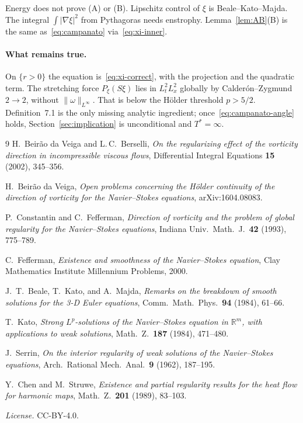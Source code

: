\documentclass[11pt,a4paper]{article}
\theoremstyle{definition}
\theoremstyle{remark}
\newcommand{\R}{\mathbb{R}}
\newcommand{\abs}[1]{\lvert#1\rvert}
\newcommand{\norm}[1]{\lVert#1\rVert}
\begin{document}
Energy does not prove (A) or (B). Lipschitz control of \(\xi\) is
Beale--Kato--Majda. The integral \(\int\abs{\nabla\xi}^2\) from
Pythagoras needs enstrophy. Lemma~\ref{lem:AB}(B) is the same as~\eqref{eq:campanato}
via~\eqref{eq:xi-inner}.

\paragraph{What remains true.}
On \(\{r>0\}\) the equation is~\eqref{eq:xi-correct}, with the projection
and the quadratic term. The stretching force \(P_\xi(S\xi)\) lies in
\(L^2_t L^2_x\) globally by Calder\'on--Zygmund \(2\to 2\), without
\(\norm{\omega}_{L^\infty}\). That is below the H\"older threshold
\(p>5/2\). Definition~7.1 is the only missing analytic ingredient;
once~\eqref{eq:campanato-angle} holds, Section~\ref{sec:implication}
is unconditional and \(T^*=\infty\).

\begin{thebibliography}{9}
H.\ Beir\~ao da Veiga and L.\,C.\ Berselli,
\emph{On the regularizing effect of the vorticity direction in incompressible viscous flows},
Differential Integral Equations \textbf{15} (2002), 345--356.

H.\ Beir\~ao da Veiga,
\emph{Open problems concerning the H\"older continuity of the direction of vorticity for the Navier--Stokes equations},
arXiv:1604.08083.

P.\ Constantin and C.\ Fefferman,
\emph{Direction of vorticity and the problem of global regularity for the Navier--Stokes equations},
Indiana Univ.\ Math.\ J.\ \textbf{42} (1993), 775--789.

C.\ Fefferman,
\emph{Existence and smoothness of the Navier--Stokes equation},
Clay Mathematics Institute Millennium Problems, 2000.

J.\ T.\ Beale, T.\ Kato, and A.\ Majda,
\emph{Remarks on the breakdown of smooth solutions for the 3-D Euler equations},
Comm.\ Math.\ Phys.\ \textbf{94} (1984), 61--66.

T.\ Kato,
\emph{Strong \(L^p\)-solutions of the Navier--Stokes equation in \(\R^m\), with applications to weak solutions},
Math.\ Z.\ \textbf{187} (1984), 471--480.

J.\ Serrin,
\emph{On the interior regularity of weak solutions of the Navier--Stokes equations},
Arch.\ Rational Mech.\ Anal.\ \textbf{9} (1962), 187--195.

Y.\ Chen and M.\ Struwe,
\emph{Existence and partial regularity results for the heat flow for harmonic maps},
Math.\ Z.\ \textbf{201} (1989), 83--103.
\end{thebibliography}

\noindent\textit{License.} CC-BY-4.0.
\end{document}
